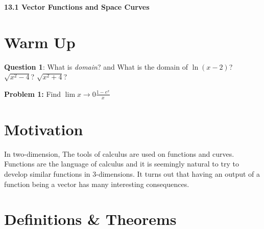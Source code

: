 \documentclass[11pt]{article}
\newcommand{\vs}{\vspace*{.1in}}
\begin{document}
\begin{LARGE}\begin{center}\bf 13.1 Vector Functions and Space Curves\end{center}
\end{LARGE}

\vs\vs



\section{Warm Up}

\textbf{Question 1}: What is \emph{domain}? and What is the domain of $\ln(x-2)$? $\sqrt{x^2-4}$? $\sqrt{x^2+4}$? 

\textbf{Problem 1:} Find $\lim{x \to 0}\frac{1-e^x}{x}$

\section{Motivation}

In two-dimension, The tools of calculus are used on functions and curves. Functions are the language of calculus and it is seemingly natural to try to develop similar functions in 3-dimensions. It turns out that having an output of a function being a vector has many interesting consequences.




\section{Definitions \& Theorems}
\end{document}
